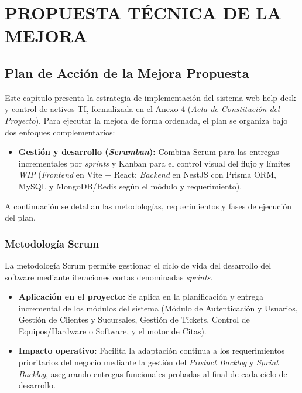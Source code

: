 \chapter[CAPÍTULO IV]{PROPUESTA TÉCNICA DE LA MEJORA}

\section{Plan de Acción de la Mejora Propuesta}

Este capítulo presenta la estrategia de implementación del sistema web help desk y control de activos TI, formalizada en el \hyperlink{anexo4_acta}{Anexo 4} (\textit{Acta de Constitución del Proyecto}). Para ejecutar la mejora de forma ordenada, el plan se organiza bajo dos enfoques complementarios:

\begin{itemize}
    \item \textbf{Gestión y desarrollo (\textit{Scrumban}):} Combina Scrum para las entregas incrementales por \textit{sprints} y Kanban para el control visual del flujo y límites \textit{WIP} (\textit{Frontend} en Vite + React; \textit{Backend} en NestJS con Prisma ORM, MySQL y MongoDB/Redis según el módulo y requerimiento).
\end{itemize}

A continuación se detallan las metodologías, requerimientos y fases de ejecución del plan.

\subsection{Metodología Scrum}
La metodología Scrum permite gestionar el ciclo de vida del desarrollo del software mediante iteraciones cortas denominadas \textit{sprints}.
\begin{itemize}
\item \textbf{Aplicación en el proyecto:} Se aplica en la planificación y entrega incremental de los módulos del sistema (Módulo de Autenticación y Usuarios, Gestión de Clientes y Sucursales, Gestión de Tickets, Control de Equipos/Hardware o Software, y el motor de Citas).
\item \textbf{Impacto operativo:} Facilita la adaptación continua a los requerimientos prioritarios del negocio mediante la gestión del \textit{Product Backlog} y \textit{Sprint Backlog}, asegurando entregas funcionales probadas al final de cada ciclo de desarrollo.
\end{itemize}

